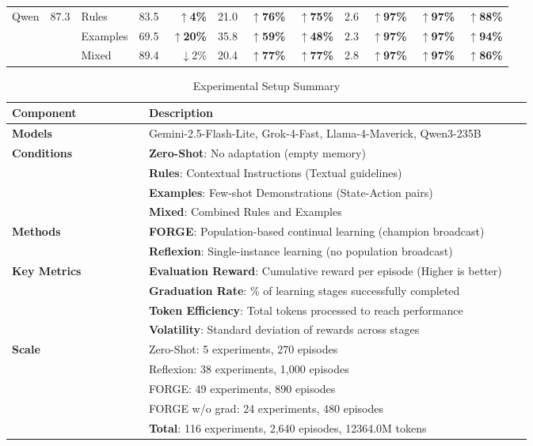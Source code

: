 \documentclass[sigconf]{acmart}
\newcommand{\up}{\ensuremath{\,{\scriptstyle\uparrow}}}
\newcommand{\dn}{\ensuremath{\,{\scriptstyle\downarrow}}}
\begin{document}
\begin{table}[htbp]
\begin{tabular}{l r l rr rrr rrrr}
  \midrule
  Qwen & \multirow{3}{*}{87.3} & Rules & 83.5 & \textbf{\up4\%} & 21.0 & \textbf{\up76\%} & \textbf{\up75\%} & 2.6 & \textbf{\up97\%} & \textbf{\up97\%} & \textbf{\up88\%} \\
   &  & Examples & 69.5 & \textbf{\up20\%} & 35.8 & \textbf{\up59\%} & \textbf{\up48\%} & $\mathbf{2.3}$ & \textbf{\up97\%} & \textbf{\up97\%} & \textbf{\up94\%} \\
   &  & Mixed & 89.4 & \dn2\% & 20.4 & \textbf{\up77\%} & \textbf{\up77\%} & 2.8 & \textbf{\up97\%} & \textbf{\up97\%} & \textbf{\up86\%} \\
  \bottomrule
  \end{tabular}
\end{table}

\begin{table}[htbp]
\centering
\scriptsize
\caption{Experimental Setup Summary}
\label{tab:app-setup-summary}
\begin{tabular}{p{0.25\linewidth} p{0.7\linewidth}}
\toprule
\textbf{Component} & \textbf{Description} \\
\midrule
\textbf{Models} & Gemini-2.5-Flash-Lite, Grok-4-Fast, Llama-4-Maverick, Qwen3-235B \\
\midrule
\textbf{Conditions} & \textbf{Zero-Shot}: No adaptation (empty memory) \\
& \textbf{Rules}: Contextual Instructions (Textual guidelines) \\
& \textbf{Examples}: Few-shot Demonstrations (State-Action pairs) \\
& \textbf{Mixed}: Combined Rules and Examples \\
\midrule
\textbf{Methods} & \textbf{FORGE}: Population-based continual learning (champion broadcast) \\
& \textbf{Reflexion}: Single-instance learning (no population broadcast) \\
\midrule
\textbf{Key Metrics} & \textbf{Evaluation Reward}: Cumulative reward per episode (Higher is better) \\
& \textbf{Graduation Rate}: \% of learning stages successfully completed \\
& \textbf{Token Efficiency}: Total tokens processed to reach performance \\
& \textbf{Volatility}: Standard deviation of rewards across stages \\
\midrule
\textbf{Scale} & \quad Zero-Shot: 5 experiments, 270 episodes \\
& \quad Reflexion: 38 experiments, 1,000 episodes \\
& \quad FORGE: 49 experiments, 890 episodes \\
& \quad FORGE w/o grad: 24 experiments, 480 episodes \\
& \textbf{Total}: 116 experiments, 2,640 episodes, 12364.0M tokens \\
\bottomrule
\end{tabular}
\end{table}
\end{document}
